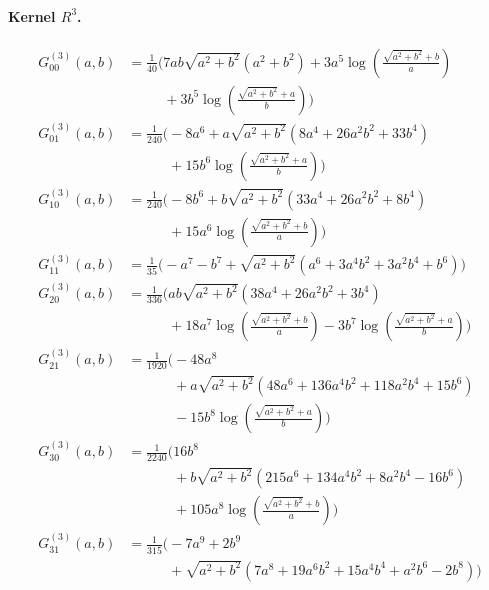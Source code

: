 \paragraph{Kernel $R^{3}$.}
\begin{align*}
G^{(3)}_{00}(a,b) &= \frac{1}{40}\Bigg(7 a b \sqrt{a^{2} + b^{2}}\left(a^{2} + b^{2}\right) + 3 a^{5} \log\left(\frac{\sqrt{a^{2} + b^{2}} + b}{a}\right)\\
&\phantom{{}=\frac{1}{40}\Bigg(}+ 3 b^{5} \log\left(\frac{\sqrt{a^{2} + b^{2}} + a}{b}\right)\Bigg)\\[1.2ex]
G^{(3)}_{01}(a,b) &= \frac{1}{240}\Bigg(- 8 a^{6} + a \sqrt{a^{2} + b^{2}}\left(8 a^{4} + 26 a^{2} b^{2} + 33 b^{4}\right)\\
&\phantom{{}=\frac{1}{240}\Bigg(}+ 15 b^{6} \log\left(\frac{\sqrt{a^{2} + b^{2}} + a}{b}\right)\Bigg)\\[1.2ex]
G^{(3)}_{10}(a,b) &= \frac{1}{240}\Bigg(- 8 b^{6} + b \sqrt{a^{2} + b^{2}}\left(33 a^{4} + 26 a^{2} b^{2} + 8 b^{4}\right)\\
&\phantom{{}=\frac{1}{240}\Bigg(}+ 15 a^{6} \log\left(\frac{\sqrt{a^{2} + b^{2}} + b}{a}\right)\Bigg)\\[1.2ex]
G^{(3)}_{11}(a,b) &= \frac{1}{35}\Bigg(- a^{7} - b^{7} + \sqrt{a^{2} + b^{2}}\left(a^{6} + 3 a^{4} b^{2} + 3 a^{2} b^{4} + b^{6}\right)\Bigg)\\[1.2ex]
G^{(3)}_{20}(a,b) &= \frac{1}{336}\Bigg(a b \sqrt{a^{2} + b^{2}}\left(38 a^{4} + 26 a^{2} b^{2} + 3 b^{4}\right)\\
&\phantom{{}=\frac{1}{336}\Bigg(}+ 18 a^{7} \log\left(\frac{\sqrt{a^{2} + b^{2}} + b}{a}\right) - 3 b^{7} \log\left(\frac{\sqrt{a^{2} + b^{2}} + a}{b}\right)\Bigg)\\[1.2ex]
G^{(3)}_{21}(a,b) &= \frac{1}{1920}\Bigg(- 48 a^{8}\\
&\phantom{{}=\frac{1}{1920}\Bigg(}+ a \sqrt{a^{2} + b^{2}}\left(48 a^{6} + 136 a^{4} b^{2} + 118 a^{2} b^{4} + 15 b^{6}\right)\\
&\phantom{{}=\frac{1}{1920}\Bigg(}- 15 b^{8} \log\left(\frac{\sqrt{a^{2} + b^{2}} + a}{b}\right)\Bigg)\\[1.2ex]
G^{(3)}_{30}(a,b) &= \frac{1}{2240}\Bigg(16 b^{8}\\
&\phantom{{}=\frac{1}{2240}\Bigg(}+ b \sqrt{a^{2} + b^{2}}\left(215 a^{6} + 134 a^{4} b^{2} + 8 a^{2} b^{4} - 16 b^{6}\right)\\
&\phantom{{}=\frac{1}{2240}\Bigg(}+ 105 a^{8} \log\left(\frac{\sqrt{a^{2} + b^{2}} + b}{a}\right)\Bigg)\\[1.2ex]
G^{(3)}_{31}(a,b) &= \frac{1}{315}\Bigg(- 7 a^{9} + 2 b^{9}\\
&\phantom{{}=\frac{1}{315}\Bigg(}+ \sqrt{a^{2} + b^{2}}\left(7 a^{8} + 19 a^{6} b^{2} + 15 a^{4} b^{4} + a^{2} b^{6} - 2 b^{8}\right)\Bigg)
\end{align*}
